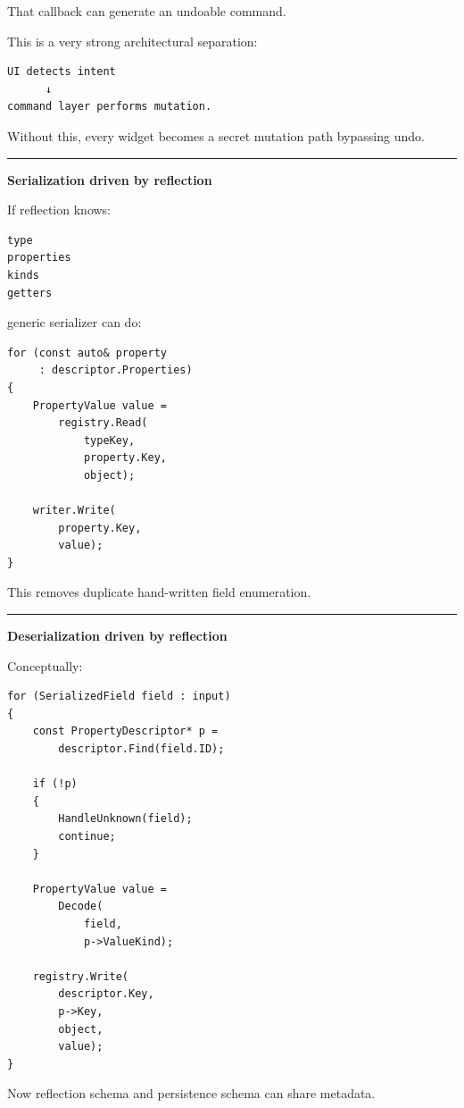 That callback can generate an undoable command.

This is a very strong architectural separation:

\begin{verbatim}
UI detects intent
      ↓
command layer performs mutation.
\end{verbatim}

Without this, every widget becomes a secret mutation path bypassing undo.

\begin{center}\rule{0.5\linewidth}{0.5pt}\end{center}

\textbf{Serialization driven by reflection}

If reflection knows:

\begin{verbatim}
type
properties
kinds
getters
\end{verbatim}

generic serializer can do:

\begin{verbatim}
for (const auto& property
     : descriptor.Properties)
{
    PropertyValue value =
        registry.Read(
            typeKey,
            property.Key,
            object);

    writer.Write(
        property.Key,
        value);
}
\end{verbatim}

This removes duplicate hand-written field enumeration.

\begin{center}\rule{0.5\linewidth}{0.5pt}\end{center}

\textbf{Deserialization driven by reflection}

Conceptually:

\begin{verbatim}
for (SerializedField field : input)
{
    const PropertyDescriptor* p =
        descriptor.Find(field.ID);

    if (!p)
    {
        HandleUnknown(field);
        continue;
    }

    PropertyValue value =
        Decode(
            field,
            p->ValueKind);

    registry.Write(
        descriptor.Key,
        p->Key,
        object,
        value);
}
\end{verbatim}

Now reflection schema and persistence schema can share metadata.

